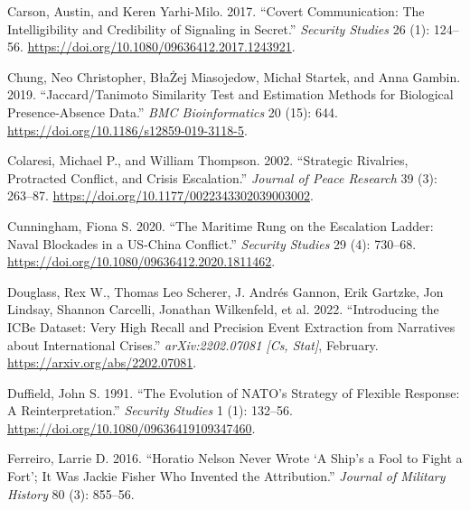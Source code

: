 \documentclass[
]{article}
\newlength{\cslhangindent}
\newlength{\cslentryspacingunit} %
\newenvironment{CSLReferences}[2] %
 {%
  \setlength{\parindent}{0pt}
  \ifodd #1
  \let\oldpar\par
  \def\par{\hangindent=\cslhangindent\oldpar}
  \fi
  \setlength{\parskip}{#2\cslentryspacingunit}
 }%
 {}
\begin{document}
\begin{CSLReferences}{1}{0}
\leavevmode{}%
Carson, Austin, and Keren Yarhi-Milo. 2017. {``Covert {Communication}: {The Intelligibility} and {Credibility} of {Signaling} in {Secret}.''} \emph{Security Studies} 26 (1): 124--56. \url{https://doi.org/10.1080/09636412.2017.1243921}.

\leavevmode{}%
Chung, Neo Christopher, BłaŻej Miasojedow, Michał Startek, and Anna Gambin. 2019. {``Jaccard/{Tanimoto} Similarity Test and Estimation Methods for Biological Presence-Absence Data.''} \emph{BMC Bioinformatics} 20 (15): 644. \url{https://doi.org/10.1186/s12859-019-3118-5}.

\leavevmode{}%
Colaresi, Michael P., and William Thompson. 2002. {``Strategic {Rivalries}, {Protracted Conflict}, and {Crisis Escalation}.''} \emph{Journal of Peace Research} 39 (3): 263--87. \url{https://doi.org/10.1177/0022343302039003002}.

\leavevmode{}%
Cunningham, Fiona S. 2020. {``The {Maritime Rung} on the {Escalation Ladder}: {Naval Blockades} in a {US-China Conflict}.''} \emph{Security Studies} 29 (4): 730--68. \url{https://doi.org/10.1080/09636412.2020.1811462}.

\leavevmode{}%
Douglass, Rex W., Thomas Leo Scherer, J. Andrés Gannon, Erik Gartzke, Jon Lindsay, Shannon Carcelli, Jonathan Wilkenfeld, et al. 2022. {``Introducing the {ICBe Dataset}: {Very High Recall} and {Precision Event Extraction} from {Narratives} about {International Crises}.''} \emph{arXiv:2202.07081 {[}Cs, Stat{]}}, February. \url{https://arxiv.org/abs/2202.07081}.

\leavevmode{}%
Duffield, John S. 1991. {``The {Evolution} of {NATO}'s {Strategy} of {Flexible Response}: {A Reinterpretation}.''} \emph{Security Studies} 1 (1): 132--56. \url{https://doi.org/10.1080/09636419109347460}.

\leavevmode{}%
Ferreiro, Larrie D. 2016. {``Horatio {Nelson Never Wrote} {`{A Ship}'s a {Fool} to {Fight} a {Fort}'}; {It Was Jackie Fisher Who Invented} the {Attribution}.''} \emph{Journal of Military History} 80 (3): 855--56.


\end{CSLReferences}
\end{document}
